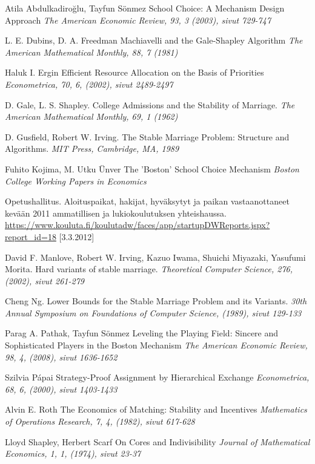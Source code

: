 \documentclass[gradu, twoside]{tktltiki}
\begin{document}
\newpage
\begin{thebibliography}{XXX99}

  Atila Abdulkadiroğlu, Tayfun Sönmez
  School Choice: A Mechanism Design Approach
  \emph{The American Economic Review, 93, 3 (2003), sivut 729-747}

  L. E. Dubins, D. A. Freedman
  Machiavelli and the Gale-Shapley Algorithm
  \emph{The American Mathematical Monthly, 88, 7 (1981)}

  Haluk I. Ergin
  Efficient Resource Allocation on the Basis of Priorities
  \emph{Econometrica, 70, 6, (2002), sivut 2489-2497}

  D. Gale, L. S. Shapley.
  College Admissions and the Stability of Marriage.
  \emph{The American Mathematical Monthly, 69, 1 (1962)}

  D. Gusfield, Robert W. Irving.
  The Stable Marriage Problem: Structure and Algorithms.
  \emph{MIT Press, Cambridge, MA, 1989}

  Fuhito Kojima, M. Utku Ünver
  The 'Boston' School Choice Mechanism
  \emph{Boston College Working Papers in Economics}

  Opetushallitus.
  Aloituspaikat, hakijat, hyväksytyt ja paikan vastaanottaneet
  kevään 2011 ammatillisen ja lukiokoulutuksen yhteishaussa.
  \url{https://www.kouluta.fi/koulutadw/faces/app/startupDWReports.jspx?report_id=18}
      [3.3.2012]

  David F. Manlove, Robert W. Irving, Kazuo Iwama, Shuichi Miyazaki,
  Yasufumi Morita.
  Hard variants of stable marriage.
  \emph{Theoretical Computer Science, 276, (2002), sivut 261-279}

  Cheng Ng.
  Lower Bounds for the Stable Marriage Problem and its Variants.
  \emph{30th Annual Symposium on Foundations of Computer Science,
    (1989), sivut 129-133}

  Parag A. Pathak, Tayfun Sönmez
  Leveling the Playing Field: Sincere and Sophisticated Players in the
  Boston Mechanism
  \emph{The American Economic Review, 98, 4, (2008), sivut 1636-1652}

  Szilvia Pápai
  Strategy-Proof Assignment by Hierarchical Exchange
  \emph{Econometrica, 68, 6, (2000), sivut 1403-1433}

  Alvin E. Roth
  The Economics of Matching: Stability and Incentives
  \emph{Mathematics of Operations Research, 7, 4, (1982), sivut 617-628}

  Lloyd Shapley, Herbert Scarf
  On Cores and Indivisibility
  \emph{Journal of Mathematical Economics, 1, 1, (1974), sivut 23-37}

\end{thebibliography}
\end{document}
